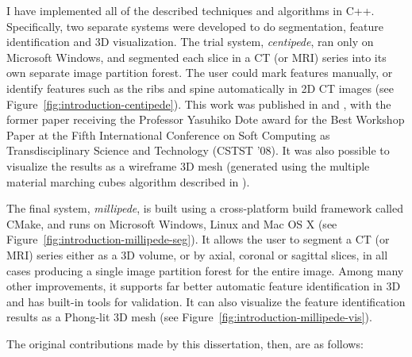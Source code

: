I have implemented all of the described techniques and algorithms in C++. Specifically, two separate systems were developed to do segmentation, feature identification and 3D visualization. The trial system, \emph{centipede}, ran only on Microsoft Windows, and segmented each slice in a CT (or MRI) series into its own separate image partition forest. The user could mark features manually, or identify features such as the ribs and spine automatically in 2D CT images (see Figure~\ref{fig:introduction-centipede}). This work was published in \cite{gvccimi08} and \cite{gvcispa09}, with the former paper receiving the Professor Yasuhiko Dote award for the Best Workshop Paper at the Fifth International Conference on Soft Computing as Transdisciplinary Science and Technology (CSTST '08). It was also possible to visualize the results as a wireframe 3D mesh (generated using the multiple material marching cubes algorithm described in \cite{wu03}).


The final system, \emph{millipede}, is built using a cross-platform build framework called CMake, and runs on Microsoft Windows, Linux and Mac OS X (see Figure~\ref{fig:introduction-millipede-seg}). It allows the user to segment a CT (or MRI) series either as a 3D volume, or by axial, coronal or sagittal slices, in all cases producing a single image partition forest for the entire image. Among many other improvements, it supports far better automatic feature identification in 3D and has built-in tools for validation. It can also visualize the feature identification results as a Phong-lit 3D mesh (see Figure~\ref{fig:introduction-millipede-vis}).


The original contributions made by this dissertation, then, are as follows:

